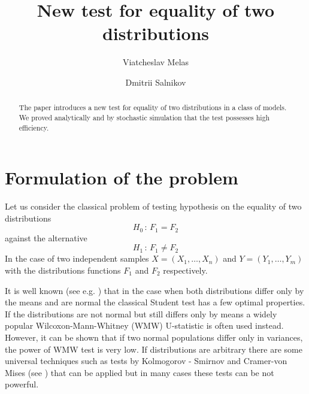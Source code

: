 \documentclass{svproc}
\begin{document}
\mainmatter              %


\title{New test for equality of two distributions}

\author{Viatcheslav Melas \and Dmitrii Salnikov}



\maketitle              %

\begin{abstract}
The paper introduces a new test for equality of two distributions in a class of models. We proved analytically and by stochastic simulation that the test possesses high efficiency.
\end{abstract}



\section{Formulation of the problem}
\label{S:1}
Let us consider the classical problem of testing hypothesis on the equality of two distributions
\begin{equation}
  \label{H0}
  H_0\,:\,F_1 = F_2
\end{equation}
against the alternative
\begin{equation}
  \label{H1}
  H_1\,:\,F_1 \not= F_2
\end{equation}
In the case of two independent samples $X=(X_{1},\ldots, X_{n})$ and $Y=(Y_{1},\ldots, Y_{m})$ with the distributions functions $F_1$ and $F_2$ respectively.


It is well known (see e.g. \cite{Lehman1986}) that in the case when both distributions differ only by the means and are normal the classical Student test has a few optimal properties. If the distributions are not normal but still differs only by means a widely popular Wilcoxon-Mann-Whitney (WMW) U-statistic is often used instead. However, it can be shown that if two normal populations differ only in variances, the power of WMW test is very low.
If distributions are arbitrary there are some universal techniques such as tests by Kolmogorov - Smirnov and Cramer-von Mises  (see \cite{Buening2001}) that can be applied but in many cases these tests can be not powerful.
\end{document}
